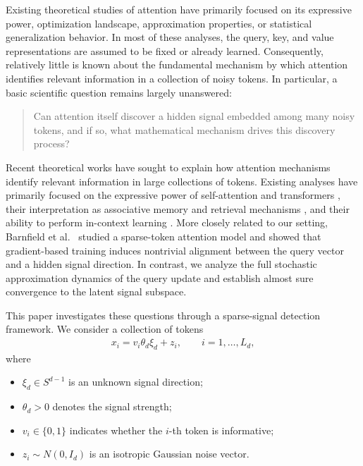 \documentclass[11pt,a4paper]{article}
\theoremstyle{definition}
\begin{document}
Existing theoretical studies of attention have primarily focused on its expressive power, optimization landscape, approximation properties, or statistical generalization behavior. In most of these analyses, the query, key, and value representations are assumed to be fixed or already learned. Consequently, relatively little is known about the fundamental mechanism by which attention identifies relevant information in a collection of noisy tokens. In particular, a basic scientific question remains largely unanswered:

\begin{quote}
Can attention itself discover a hidden signal embedded among many noisy tokens, and if so, what mathematical mechanism drives this discovery process?
\end{quote}

Recent theoretical works have sought to explain how attention mechanisms identify relevant information in large collections of tokens. Existing analyses have primarily focused on the expressive power of self-attention and transformers \cite{yun2020transformers,likhosherstov2021expressive,perez2019turing}, their interpretation as associative memory and retrieval mechanisms \cite{ramsauer2021hopfield}, and their ability to perform in-context learning \cite{garg2022can,vonoswald2023transformers,Cao2026TransformersLR}. More closely related to our setting, Barnfield et al.~\cite{barnfield2025sparse} studied a sparse-token attention model and showed that gradient-based training induces nontrivial alignment between the query vector and a hidden signal direction. In contrast, we analyze the full stochastic approximation dynamics of the query update and establish almost sure convergence to the latent signal subspace.

This paper investigates these questions through a sparse-signal detection framework. We consider a collection of tokens
\begin{align}
x_i
=
v_i \theta_d \xi_d + z_i,
\qquad
i=1,\ldots,L_d,
\end{align}
where
\begin{itemize}
\item $\xi_d \in S^{d-1}$ is an unknown signal direction;
\item $\theta_d>0$ denotes the signal strength;
\item $v_i\in\{0,1\}$ indicates whether the $i$-th token is informative;
\item $z_i\sim N(0,I_d)$ is an isotropic Gaussian noise vector.
\end{itemize}
\end{document}
